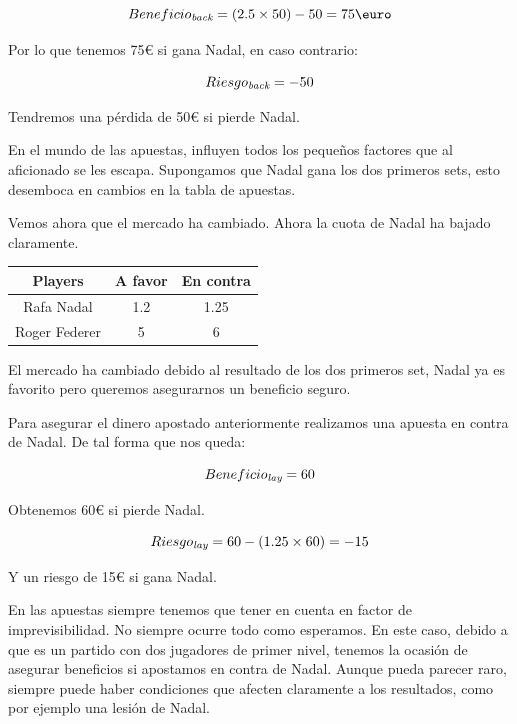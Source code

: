   
\begin{displaymath}
  Beneficio_\emph{back} = (2.5 \times 50) - 50 =  75\euro  
\end{displaymath}

Por lo que tenemos 75\euro{} si gana Nadal, en caso contrario:
 
 \begin{displaymath}
  Riesgo_\emph{back} = - 50 
\end{displaymath}

Tendremos una pérdida de 50\euro{} si pierde Nadal.

En el mundo de las apuestas, influyen todos los pequeños factores que al aficionado se les escapa. Supongamos que Nadal gana los dos primeros sets, esto desemboca en cambios en la tabla de apuestas. 

Vemos ahora que el mercado ha cambiado. Ahora la cuota de Nadal ha bajado claramente.
   
 \begin{center}
    \begin{tabular}{| c | c | c |}
      \hline
      \hline
      \textbf{Players} & \textbf{A favor} & \textbf{En contra}\\
      \hline
      \hline
      Rafa Nadal & 1.2 & 1.25\\
      \hline
      \hline
      Roger Federer & 5 & 6\\
      \hline
      \hline
    \end{tabular}
  \end{center}
  
  
  El mercado ha cambiado debido al resultado de los dos primeros set, Nadal ya es favorito pero queremos asegurarnos un beneficio seguro.
  
Para asegurar el dinero apostado anteriormente realizamos una apuesta en contra de Nadal. De tal forma que nos queda:

  \begin{displaymath}
  Beneficio_\emph{lay} = 60 
  \end{displaymath} 
  
   Obtenemos 60\euro{} si pierde Nadal.
   
   \begin{displaymath}
  Riesgo_\emph{lay} = 60 - (1.25 \times 60) = -15
  \end{displaymath} 
  
  Y un riesgo de 15\euro{} si gana Nadal.
  
En las apuestas siempre tenemos que tener en cuenta en factor de imprevisibilidad. No siempre ocurre todo como esperamos. En este caso, debido a que es un partido con dos jugadores de primer nivel, tenemos la ocasión de asegurar beneficios si apostamos en contra de Nadal. Aunque pueda parecer raro, siempre puede haber condiciones que afecten claramente a los resultados, como por ejemplo una lesión de Nadal.
	 
